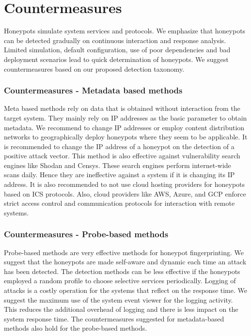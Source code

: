 \section{Countermeasures}
\label{sec:counter}

Honeypots simulate system services and protocols. We emphasize that honeypots can be detected gradually on continuous interaction and response analysis. Limited simulation, default configuration, use of poor dependencies and bad deployment scenarios lead to quick determination of honeypots. We suggest countermeasures based on our proposed detection taxonomy. 

\subsubsection{Countermeasures - Metadata based methods}
Meta based methods rely on data that is obtained without interaction from the target system. They mainly rely on IP addresses as the basic parameter to obtain metadata. We recommend to change IP addresses or employ content distribution networks to geographically deploy honeypots where they seem to be applicable.  It is recommended to change the IP address of a honeypot on the detection of a positive attack vector. This method is also effective against vulnerability search engines like Shodan and Censys. These search engines perform internet-wide scans daily. Hence they are ineffective against a system if it is changing its IP address. It is also recommended to not use cloud hosting providers for honeypots based on ICS protocols. Also, cloud providers like AWS, Azure, and GCP enforce strict access control and communication protocols for interaction with remote systems. 


\subsubsection{Countermeasures - Probe-based methods}
Probe-based methods are very effective methods for honeypot fingerprinting. We suggest that the honeypots are made self-aware and dynamic each time an attack has been detected. The detection methods can be less effective if the honeypots employed a random profile to choose selective services periodically.  Logging of attacks is a costly operation for the systems that reflect on the response time. We suggest the maximum use of the system event viewer for the logging activity. This reduces the additional overhead of logging and there is less impact on the system response time. The countermeasures suggested for metadata-based methods also hold for the probe-based methods. 

